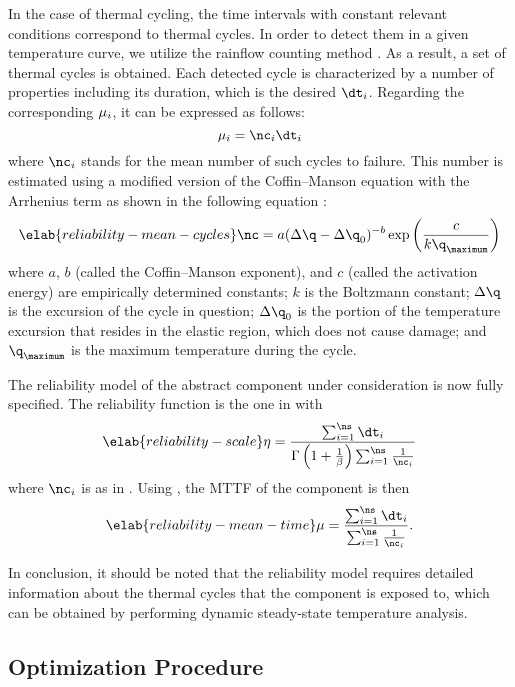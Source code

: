 In the case of thermal cycling, the time intervals with constant relevant
conditions correspond to thermal cycles. In order to detect them in a given
temperature curve, we utilize the rainflow counting method \cite{xiang2010}. As
a result, a set of \ns thermal cycles is obtained. Each detected cycle is
characterized by a number of properties including its duration, which is the
desired $\dt_i$. Regarding the corresponding $\mu_i$, it can be expressed as
follows:
\[
  \mean_i = \nc_i \dt_i
\]
where $\nc_i$ stands for the mean number of such cycles to failure. This number
is estimated using a modified version of the Coffin--Manson equation with the
Arrhenius term as shown in the following equation \cite{xiang2010, jedec2010}:
\begin{equation} \elab{reliability-mean-cycles}
  \nc = a (\Delta \q - \Delta \q_0)^{-b} \exp\left(\frac{c}{k \q_\maximum}\right)
\end{equation}
where $a$, $b$ (called the Coffin--Manson exponent), and $c$ (called the
activation energy) are empirically determined constants; $k$ is the Boltzmann
constant; $\Delta \q$ is the excursion of the cycle in question; $\Delta \q_0$
is the portion of the temperature excursion that resides in the elastic region,
which does not cause damage; and $\q_\maximum$ is the maximum temperature during
the cycle.

The reliability model of the abstract component under consideration is now fully
specified. The reliability function is the one in 
with
\begin{equation} \elab{reliability-scale}
  \scale = \frac{\sum_{i = 1}^\ns \dt_i}{\Gamma\left(1 + \frac{1}{\shape}\right) \sum_{i = 1}^\ns \frac{1}{\nc_i}}
\end{equation}
where $\nc_i$ is as in . Using
, the \ac{MTTF} of the
component is then
\begin{equation} \elab{reliability-mean-time}
  \mean = \frac{\sum_{i = 1}^\ns \dt_i}{\sum_{i = 1}^\ns \frac{1}{\nc_i}}.
\end{equation}

In conclusion, it should be noted that the reliability model requires detailed
information about the thermal cycles that the component is exposed to, which can
be obtained by performing dynamic steady-state temperature analysis.

\subsection{Optimization Procedure}

